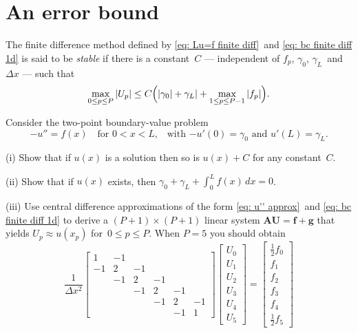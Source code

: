 \section{An error bound}

The finite difference method defined by \eqref{eq: Lu=f finite diff}~and 
\eqref{eq: bc finite diff 1d} is said to be \emph{stable} if there is a 
constant~$C$ --- independent of $f_p$, $\gamma_0$, $\gamma_L$~and $\Delta x$
--- such that
\[
\max_{0\le p\le P}|U_p|\le C\Bigl(|\gamma_0|+\gamma_L|
    +\max_{1\le p\le P-1} |f_p|\Bigr).
\]

\begin{Exercises}
 
\exercise
Consider the two-point boundary-value problem
\[
-u''=f(x)\quad\text{for $0<x<L$,}
	\quad\text{with $-u'(0)=\gamma_0$ and $u'(L)=\gamma_L$.}
\]
\begin{description}
\item{(i)} Show that if $u(x)$ is a solution then so is $u(x)+C$ for any 
constant~$C$.
\item{(ii)} Show that if $u(x)$ exists, then 
$\gamma_0+\gamma_L+\int_0^Lf(x)\,dx=0$.
\item{(iii)} Use central difference approximations of the 
form \eqref{eq: u'' approx}~and \eqref{eq: bc finite diff 1d} to derive a 
$(P+1)\times(P+1)$ linear system 
$\boldsymbol{A}\boldsymbol{U}=\boldsymbol{f}+\boldsymbol{g}$ that yields
$U_p\approx u(x_p)$ for~$0\le p\le P$.  When $P=5$ you should obtain
\[
\frac{1}{\Delta x^2}\begin{bmatrix}
 1&-1&  &  &  &\\                     
-1& 2&-1&  &  &\\
  &-1& 2&-1&  &\\
  &  &-1& 2&-1&\\
  &  &  &-1& 2&-1\\
  &  &  &  &-1& 1
\end{bmatrix}
\begin{bmatrix}U_0\\ U_1\\ U_2\\ U_3\\ U_4\\ U_5\end{bmatrix}
=\begin{bmatrix}\tfrac12f_0\\ f_1\\ f_2\\ f_3\\ f_4\\ \tfrac12 f_5

\end{bmatrix}\]
\end{description}
\end{Exercises}
